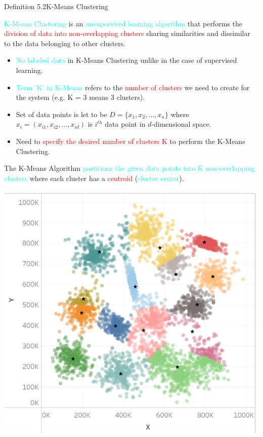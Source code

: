 \documentclass{book}
\begin{document}
\begin{defBox}{Definition 5.2}{K-Means Clustering}
    \raggedright
    \textcolor{cyan}{K-Means Clustering} is an \textcolor{cyan}{unsupervised learning algorithm} that performs the \textcolor{red}{division of data into non-overlapping clusters} sharing similarities and dissimilar to the data belonging to other clusters.\\
    \begin{itemize}
        \item \textcolor{cyan}{No labeled data} in K-Means Clustering unlike in the case of supervised learning.
        \item \textcolor{cyan}{Term 'K' in K-Means} refers to the \textcolor{red}{number of clusters} we need to create for the system (e.g. K = 3 means 3 clusters).
        \item Set of data points is let to be \(D = \{x_1, x_2, \ldots, x_n\}\) where \(x_i = (x_{i1}, x_{i2}, \ldots, x_{id})\) is \(i^{th}\) data point in \(d\)-dimensional space.
        \item Need to \textcolor{red}{specify the desired number of clusters K} to perform the K-Means Clustering.\\
    \end{itemize}
    The K-Means Algorithm \textcolor{cyan}{partitions the given data points into K non-overlapping clusters} where each cluster has a \textcolor{red}{centroid} (\textcolor{cyan}{cluster center}).
    \begin{center}
        \includegraphics[scale=0.3]{chapter 5/ch5_figure2.jpeg}
    \end{center}
\end{defBox}
\end{document}
